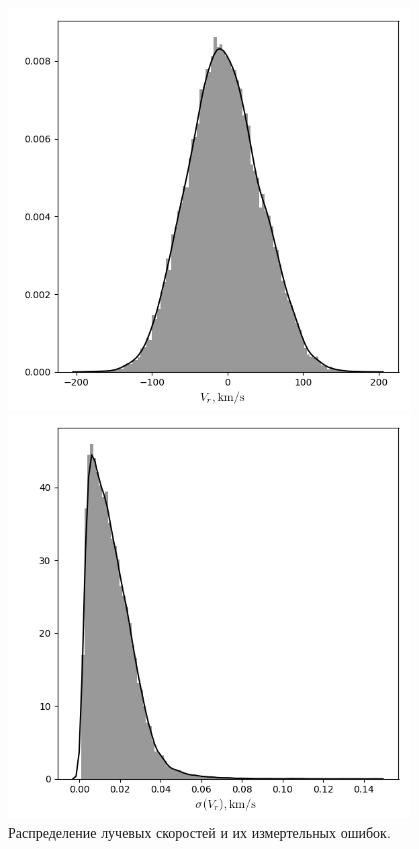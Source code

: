 \documentclass{matmex-diploma-custom}
\begin{document}
\begin{figure}[h!]
\begin{minipage}[h]{0.49\linewidth}
        \includegraphics[width=0.95\textwidth]{../imgs/vr_distr.png}
\end{minipage}
\hfill
\begin{minipage}[h]{0.49\linewidth}
        \includegraphics[width=0.95\textwidth]{../imgs/vr_err_distr.png}
\end{minipage}
\caption{Распределение лучевых скоростей и их измертельных ошибок.}
\end{figure}
\end{document}
